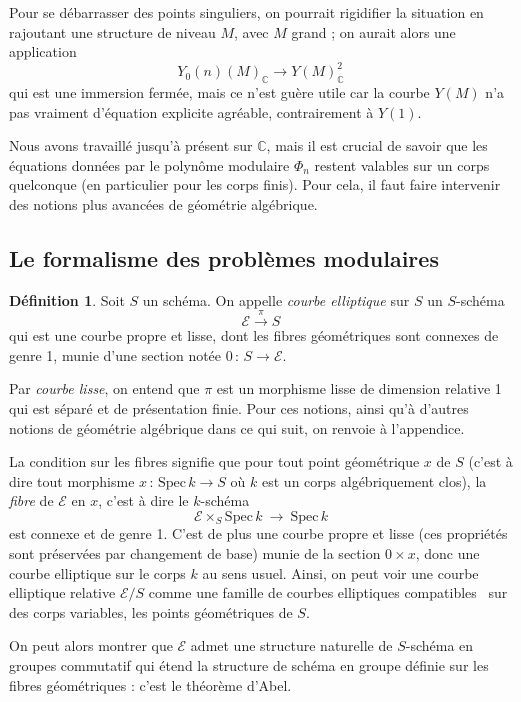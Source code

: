 \documentclass[11pt,a4paper]{article}
\newcommand{\C}{\mathbb{C}}
\newcommand{\E}{\mathcal{E}}
\newcommand{\vers}{\longrightarrow}
\newcommand{\Spec}{\mathrm{Spec}\,}
\newcommand{\de}{\,:\,}
\theoremstyle{definition}
\newtheorem*{defi}{Définition}
\begin{document}
Pour se débarrasser des points singuliers, on pourrait rigidifier la situation en rajoutant une structure de niveau $M$, avec $M$ grand ; on aurait alors une application
$$Y_0(n)(M)_\C\vers Y(M)_\C^2$$
qui est une immersion fermée, mais ce n'est guère utile car la courbe $Y(M)$ n'a pas vraiment d'équation explicite agréable, contrairement à $Y(1)$.

Nous avons travaillé jusqu'à présent sur $\C$, mais il est crucial de savoir que les équations données par le polynôme modulaire $\Phi_n$ restent valables sur un corps quelconque (en particulier pour les corps finis). Pour cela, il faut faire intervenir des notions plus avancées de géométrie algébrique.


\subsection{Le formalisme des problèmes modulaires}

\begin{defi}
Soit $S$ un schéma. On appelle \emph{courbe elliptique} sur $S$ un $S$-schéma
$$\E \overset{\pi}{\vers} S$$
qui est une courbe propre et lisse, dont les fibres géométriques sont connexes de genre 1, munie d'une section notée $0\de S\vers \E$.
\end{defi}

Par \emph{courbe lisse}, on entend que $\pi$ est un morphisme lisse de dimension relative 1 qui est séparé et de présentation finie. Pour ces notions, ainsi qu'à d'autres notions de géométrie algébrique dans ce qui suit, on renvoie à l'appendice.

La condition sur les fibres signifie que pour tout point géométrique $x$ de $S$ (c'est à dire tout morphisme $x\de\Spec k\vers S$ où $k$ est un corps algébriquement clos), la \emph{fibre} de $\E$ en $x$, c'est à dire le $k$-schéma
$$\E \times_S \Spec k\ \vers\ \Spec k$$
est connexe et de genre 1. C'est de plus une courbe propre et lisse (ces propriétés sont préservées par changement de base) munie de la section $0 \times x$, donc une courbe elliptique sur le corps $k$ au sens usuel. Ainsi, on peut voir une courbe elliptique relative $\E/S$ comme une famille de courbes elliptiques \og compatibles \fg\ sur des corps variables, les points géométriques de $S$.

On peut alors montrer que $\E$ admet une structure naturelle de $S$-schéma en groupes commutatif qui étend la structure de schéma en groupe définie sur les fibres géométriques : c'est le théorème d'Abel.
\end{document}
